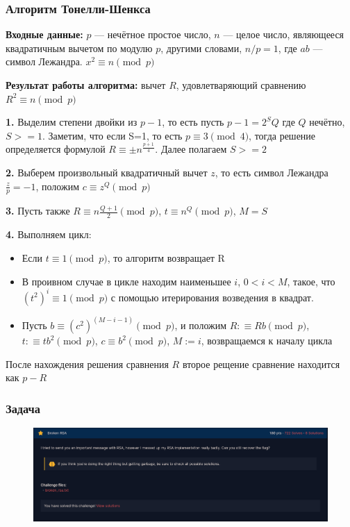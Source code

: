 \documentclass[8pt]{beamer}
\begin{document}
\begin{frame}
	\frametitle{Алгоритм Тонелли-Шенкса}
	\textbf{Входные данные:} $p$ — нечётное простое число, $n$ — целое число, являющееся квадратичным вычетом по модулю $p$, другими словами, $n/p = 1$, где $ab$ — символ Лежандра. 
	$x^2 ≡ n \pmod p$
	
	\textbf{Результат работы алгоритма:} вычет $R$, удовлетваряющий сравнению $R^2\equiv n\pmod p$
		
		\textbf{1.} Выделим степени двойки из $p-1$, то есть пусть $p-1=2^SQ$ где $Q$ нечётно, $S >= 1$. Заметим, что если S=1, то есть $p\equiv3\pmod4$, тогда решение определяется формулой $R\equiv \pm n^ \frac{p+1}{4}$. Далее полагаем $S>=2$
		
		\textbf{2.} Выберем произвольный квадратичный вычет $z$, то есть символ Лежандра $\frac{z}{p} = -1$, положим $c\equiv z^Q \pmod p$
		
		\textbf{3.} Пусть также $R \equiv n \frac{Q+1}{2} \pmod p$, $t \equiv n^Q \pmod p$, $M=S$
		
		\textbf{4.} Выполняем цикл:
		
		\begin{itemize}
			\item Если $t \equiv 1 \pmod p$, то алгоритм возвращает R
		
			\item В проивном случае в цикле находим наименьшее $i$, $0 <i<M$, такое, что $(t^2)^i \equiv 1 \pmod p$ с помощью итерирования возведения в квадрат.
		
			\item Пусть $b \equiv (c^2)^(M-i-1) \pmod p$, и положим $R: \equiv Rb \pmod p$, $t: \equiv tb^2 \pmod p$, $c \equiv b^2 \pmod p$, $M := i$, возвращаемся к началу цикла
		\end{itemize}
	
	После нахождения решения сравнения $R$ второе рещение сравнение находится как $p-R$
\end{frame}


\begin{frame}
	\frametitle{Задача}
	
	\begin{figure}
		\includegraphics[scale=0.2]{Brocken RSA.png}	
	\end{figure}
		
\end{frame}
\end{document}
